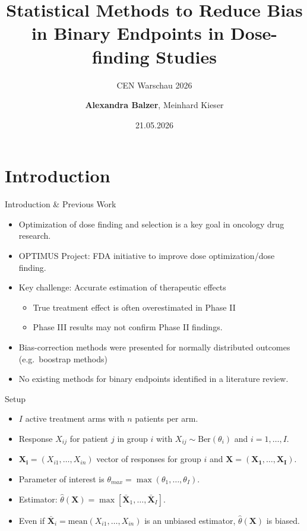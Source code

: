 \documentclass[
  ignorenonframetext,
  aspectratio=169]{beamer}
\title[Statistical Methods to Reduce Bias in Binary Endpoints in
Dose-finding Studies]{Statistical Methods to Reduce Bias in Binary
Endpoints in Dose-finding Studies}
\subtitle{CEN Warschau 2026}
\author[\textbf{Balzer}, Kieser]{\textbf{Alexandra Balzer}, Meinhard
Kieser}
\date{21.05.2026}
\institute{Institute of Medical Biometry \break University of
Heidelberg}
\providecommand{\tightlist}{%
  \setlength{\itemsep}{0pt}\setlength{\parskip}{0pt}}
\begin{document}
\frame[plain]{\titlepage}


\section{Introduction}\label{introduction}

\begin{frame}{Introduction \& Previous Work}
\protect{}\label{introduction-previous-work}
\begin{itemize}
\tightlist
\item
  Optimization of dose finding and selection is a key goal in oncology
  drug research.
\item
  OPTIMUS Project: FDA initiative to improve dose optimization/dose
  finding.
\item
  Key challenge: Accurate estimation of therapeutic effects

  \begin{itemize}
  \tightlist
  \item
    True treatment effect is often overestimated in Phase II
  \item
    Phase III results may not confirm Phase II findings.
  \end{itemize}
\item
  Bias-correction methods were presented for normally distributed
  outcomes (e.g.~boostrap methods) \citep{tianyu2024}
\item
  No existing methods for binary endpoints identified in a literature
  review.
\end{itemize}
\end{frame}

\begin{frame}{Setup}
\protect{}\label{setup}
\begin{itemize}
\item
  \(I\) active treatment arms with \(n\) patients per arm.
\item
  Response \(X_{ij}\) for patient \(j\) in group \(i\) with
  \(X_{ij} \sim \textrm{Ber}(\theta_i)\) and \(i = 1, \dots, I\).
\item
  \(\mathbf{X_i} = (X_{i1}, \dots, X_{in})\) vector of responses for
  group \(i\) and \(\mathbf{X} = (\mathbf{X_1}, \dots, \mathbf{X_I}).\)
\item
  Parameter of interest is
  \(\theta_{max} = \max(\theta_1, \dots, \theta_I).\)
\item
  Estimator:
  \(\hat{\theta}(\mathbf{X}) = \max[\bar{\mathbf{X}}_1, \dots ,\bar{\mathbf{X}}_I]\).
\item
  Even if \(\bar{\mathbf{X}}_i = \mathrm{mean}(X_{i1}, \dots, X_{in})\)
  is an unbiased estimator, \(\hat{\theta}(\mathbf{X})\) is biased.
\end{itemize}
\end{frame}
\end{document}
